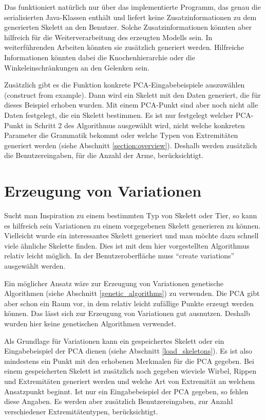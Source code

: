 Das funktioniert natürlich nur über das implementierte Programm, das genau die serialisierten Java-Klassen enthält und liefert keine Zusatzinformationen zu dem generierten Skelett an den Benutzer. Solche Zusatzinformationen könnten aber hilfreich für die Weiterverarbeitung des erzeugten Modells sein. In weiterführenden Arbeiten könnten sie zusätzlich generiert werden. Hilfreiche Informationen könnten dabei \zb die Knochenhierarchie oder die Winkeleinschränkungen an den Gelenken sein.

Zusätzlich gibt es die Funktion konkrete PCA-Eingabebeispiele auszuwählen (construct from example). Dann wird ein Skelett mit den Daten generiert, die für dieses Beispiel erhoben wurden. Mit einem PCA-Punkt sind aber noch nicht alle Daten festgelegt, die ein Skelett bestimmen. Es ist nur festgelegt welcher PCA-Punkt in Schritt 2 des Algorithmus ausgewählt wird, nicht welche konkreten Parameter die Grammatik bekommt oder welche Typen von Extremitäten generiert werden (siehe Abschnitt \ref{section:overview}). Deshalb werden zusätzlich die Benutzereingaben, \zb für die Anzahl der Arme, berücksichtigt.


\section{Erzeugung von Variationen}

Sucht man Inspiration zu einem bestimmten Typ von Skelett oder Tier, so kann es hilfreich sein Variationen zu einem vorgegebenen Skelett generieren zu können. 
Vielleicht wurde ein interessantes Skelett generiert und man möchte dazu schnell viele ähnliche Skelette finden.
Dies ist mit dem hier vorgestellten Algorithmus relativ leicht möglich. In der Benutzeroberfläche muss "`create variations"' ausgewählt werden.

Ein möglicher Ansatz wäre zur Erzeugung von Variationen genetische Algorithmen (siehe Abschnitt \ref{genetic_algorithms}) zu verwenden. Die PCA gibt aber schon ein Raum vor, in dem relativ leicht zufällige Punkte erzeugt werden können. Das lässt sich zur Erzeugung von Variationen gut ausnutzen. Deshalb wurden hier keine genetischen Algorithmen verwendet. 

Als Grundlage für Variationen kann ein gespeichertes Skelett oder ein Eingabebeispiel der PCA dienen (siehe Abschnitt \ref{load_skeletons}). Es ist also mindestens ein Punkt mit den erhobenen Merkmalen für die PCA gegeben. Bei einem gespeicherten Skelett ist zusätzlich noch gegeben wieviele Wirbel, Rippen und Extremitäten generiert werden und welche Art von Extremität an welchem Ansatzpunkt beginnt.
Ist nur ein Eingabebeispiel der PCA gegeben, so fehlen diese Angaben. Es werden aber zusätzlich Benutzereingaben, \zb zur Anzahl verschiedener Extremitätentypen, berücksichtigt.

